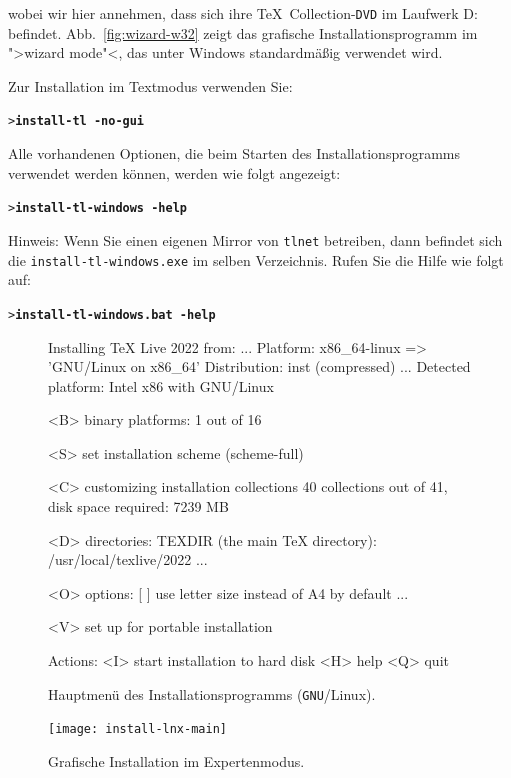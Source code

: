 \documentclass[12pt,ngerman,a4paper,fullparskip]{scrreprt}
\newcommand{\acro}[1]{\texttt{#1}}
\newcommand{\dirname}[1]{\texttt{#1}}
\newcommand{\Ucom}[1]{\textbf{\texttt{#1}}}
\def\TK{\TeX\ Collection}
\providecommand*{\DVD}{\acro{DVD}\xspace}
\providecommand*{\GNU}{\acro{GNU}\xspace}
\begin{document}
wobei wir hier annehmen, dass sich ihre \TK-\DVD im Laufwerk D: befindet.
Abb.~\ref{fig:wizard-w32} zeigt das grafische Installationsprogramm im
">wizard mode"<, das unter Windows standardmäßig verwendet wird.

Zur Installation im Textmodus verwenden Sie:
\begin{alltt}
> \Ucom{install-tl -no-gui}
\end{alltt}

\noindent Alle vorhandenen Optionen, die beim Starten des Installationsprogramms verwendet werden können, werden
wie folgt angezeigt:

\begin{alltt}
> \Ucom{install-tl-windows -help}
\end{alltt}

Hinweis: Wenn Sie einen eigenen Mirror von \dirname{tlnet} betreiben, dann befindet sich die \texttt{install-tl-windows.exe} im selben Verzeichnis. Rufen Sie die Hilfe wie folgt auf:

\begin{alltt}
> \Ucom{install-tl-windows.bat -help}
\end{alltt}


\begin{figure}[tb]
\begin{boxedverbatim}
Installing TeX Live 2022 from: ...
Platform: x86_64-linux => 'GNU/Linux on x86_64'
Distribution: inst (compressed)
...
 Detected platform: Intel x86 with GNU/Linux
 
 <B> binary platforms: 1 out of 16

 <S> set installation scheme (scheme-full)

 <C> customizing installation collections
     40 collections out of 41, disk space required: 7239 MB

 <D> directories:
   TEXDIR (the main TeX directory):
     /usr/local/texlive/2022
   ...

 <O> options:
   [ ] use letter size instead of A4 by default
   ...
 
 <V> set up for portable installation

Actions:
 <I> start installation to hard disk
 <H> help
 <Q> quit
\end{boxedverbatim}
\caption{Hauptmenü des Installationsprogramms (\GNU/Linux).}\label{fig:text-main}
\end{figure}

\begin{figure}[tb]
\texttt{[image: install-lnx-main]}
\caption{Grafische Installation im Expertenmodus.}\label{fig:gui-main}
\end{figure}
\end{document}
